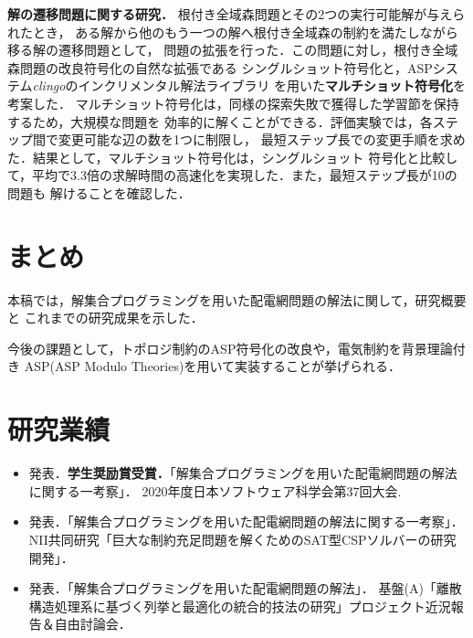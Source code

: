 \documentclass[a4j,10pt,dvipdfmx]{jarticle}
\newcommand{\mysection}[1]{\vspace{-15pt}\section{#1}} %
\begin{document}
\begin{multicols}{1}


\textbf{解の遷移問題に関する研究．}
%
根付き全域森問題とその2つの実行可能解が与えられたとき，
ある解から他のもう一つの解へ根付き全域森の制約を満たしながら移る解の遷移問題として，
問題の拡張を行った．この問題に対し，根付き全域森問題の改良符号化の自然な拡張である
シングルショット符号化と，ASPシステム\textit{clingo}のインクリメンタル解法ライブラリ
を用いた\textbf{マルチショット符号化}を考案した．
マルチショット符号化は，同様の探索失敗で獲得した学習節を保持するため，大規模な問題を
効率的に解くことができる．評価実験では，各ステップ間で変更可能な辺の数を1つに制限し，
最短ステップ長での変更手順を求めた．結果として，マルチショット符号化は，シングルショット
符号化と比較して，平均で3.3倍の求解時間の高速化を実現した．また，最短ステップ長が10の問題も
解けることを確認した．

\mysection{まとめ}

本稿では，解集合プログラミングを用いた配電網問題の解法に関して，研究概要と
これまでの研究成果を示した．

今後の課題として，トポロジ制約のASP符号化の改良や，電気制約を背景理論付き
ASP(ASP Modulo Theories)を用いて実装することが挙げられる．


\mysection{研究業績}

\begin{itemize}
 \setlength{\parskip}{0pt} %
 \setlength{\itemsep}{2pt} %
 \small
 \item 発表．\textbf{学生奨励賞受賞．}「解集合プログラミングを用いた配電網問題の解法に関する一考察」．
	   2020年度日本ソフトウェア科学会第37回大会. 
 \item 発表．「解集合プログラミングを用いた配電網問題の解法に関する一考察」．
	   NII共同研究「巨大な制約充足問題を解くためのSAT型CSPソルバーの研究開発」．
 \item 発表．「解集合プログラミングを用いた配電網問題の解法」．
	   基盤(A)「離散構造処理系に基づく列挙と最適化の統合的技法の研究」プロジェクト近況報告＆自由討論会．
\end{itemize}


%  


\end{multicols}
\end{document}
